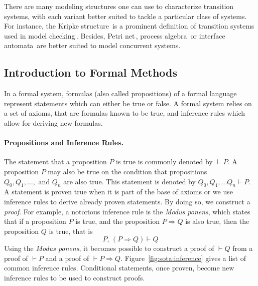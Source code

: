There are many modeling structures one can use to characterize transition
systems, with each variant better suited to tackle a particular class of
systems.
%
For instance, the Kripke structure\,\cite{kripke1971semantical} is a prominent
definition of transition systems used in model checking\,\cite{clarke1999model}.
%
Besides, Petri net\,\cite{peterson1981petri}, process
algebra\,\cite{bergstra1984process} or interface
automata\,\cite{de2001interface} are better suited to model concurrent systems.

\subsection{Introduction to Formal Methods}
\label{subsec:sota:fm}

In a formal system, formulas (also called propositions) of a formal language
represent statements which can either be true or false.
%
A formal system relies on a set of axioms, that are formulas known to be true,
and inference rules which allow for deriving new formulas.

\paragraph{Propositions and Inference Rules.}
%
The statement that a proposition \( P \) is true is commonly denoted by
\( \vdash P \).
%
A proposition \( P \) may also be true on the condition that propositions
\( Q_0, Q_1, ..., \text{ and } Q_n \) are also true.
%
This statement is denoted by \( Q_0, Q_1, ... Q_n \vdash P \).
%
A statement is proven true when it is part of the base of axioms or we use
inference rules to derive already proven statements.
%
By doing so, we construct a \emph{proof}.
%
For example, a notorious inference rule is the \emph{Modus ponens}, which states
that if a proposition \( P \) is true, and the proposition \( P \Rightarrow Q \)
is also true, then the proposition \( Q \) is true, that is
%
\[
  P\text{, }(P \Rightarrow Q) \vdash Q
\]
%
Using the \emph{Modus ponens}, it becomes possible to construct a proof of
\( \vdash Q \) from a proof of \( \vdash P \) and a proof of
\( \vdash P \Rightarrow Q \).
%
Figure~\ref{fig:sota:inference} gives a list of common inference rules.
%
Conditional statements, once proven, become new inference rules to be used to
construct proofs.

